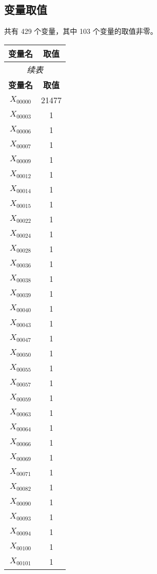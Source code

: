 \documentclass[a4paper,10pt]{article}
\begin{document}
\subsection{变量取值}

共有 429 个变量，其中 103 个变量的取值非零。

\begin{center}
\begin{longtable}{cc}
\toprule
\textbf{变量名} & \textbf{取值} \\
\midrule
\endfirsthead
\multicolumn{2}{c}{\textit{续表}} \\
\toprule
\textbf{变量名} & \textbf{取值} \\
\midrule
\endhead
\bottomrule
\endfoot
\bottomrule
\endlastfoot
$X_{00000}$ & 21477 \\
$X_{00003}$ & 1 \\
$X_{00006}$ & 1 \\
$X_{00007}$ & 1 \\
$X_{00009}$ & 1 \\
$X_{00012}$ & 1 \\
$X_{00014}$ & 1 \\
$X_{00015}$ & 1 \\
$X_{00022}$ & 1 \\
$X_{00024}$ & 1 \\
$X_{00028}$ & 1 \\
$X_{00036}$ & 1 \\
$X_{00038}$ & 1 \\
$X_{00039}$ & 1 \\
$X_{00040}$ & 1 \\
$X_{00043}$ & 1 \\
$X_{00047}$ & 1 \\
$X_{00050}$ & 1 \\
$X_{00055}$ & 1 \\
$X_{00057}$ & 1 \\
$X_{00059}$ & 1 \\
$X_{00063}$ & 1 \\
$X_{00064}$ & 1 \\
$X_{00066}$ & 1 \\
$X_{00069}$ & 1 \\
$X_{00071}$ & 1 \\
$X_{00082}$ & 1 \\
$X_{00090}$ & 1 \\
$X_{00093}$ & 1 \\
$X_{00094}$ & 1 \\
$X_{00100}$ & 1 \\
$X_{00101}$ & 1 \\

\end{longtable}
\end{center}
\end{document}
